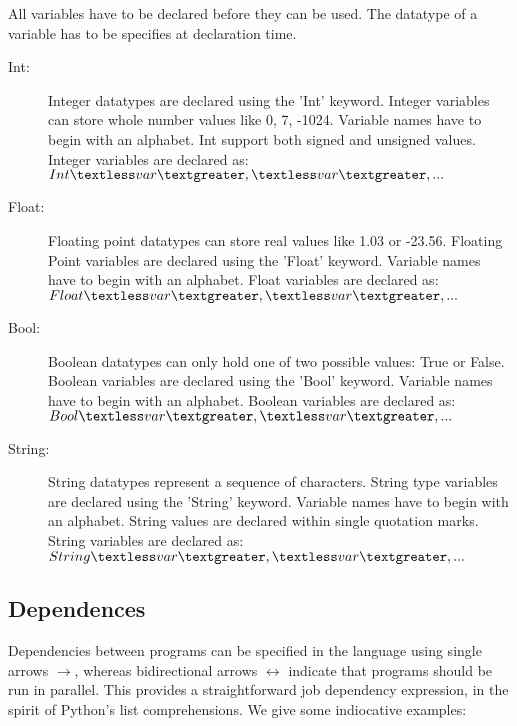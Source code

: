 All variables have to be declared before they can be used. The datatype of a 
variable has to be specifies at declaration time.
\begin{description}
\item [Int:] Integer datatypes are declared using the 'Int' keyword. Integer 
variables can store whole number values like 0, 7, -1024. Variable names have 
to begin with an alphabet. Int support both signed and unsigned values.
Integer variables are declared as:
$Int \textless var\textgreater, \textless var\textgreater, ...$ 



\item [Float:] Floating point datatypes can store real values like 1.03 or -23.56. 
Floating Point variables are declared using the 'Float' keyword. Variable names 
have to begin with an alphabet. Float variables are declared as:
$Float \textless  var\textgreater, \textless  var\textgreater, ...$



\item [Bool:] Boolean datatypes can only hold one of two possible values: 
True or False. Boolean variables are declared using the 'Bool' keyword. Variable 
names have to begin with an alphabet. Boolean variables are declared as:
$Bool \textless  var\textgreater, \textless  var\textgreater, ...$
%



\item [String:] String datatypes represent a sequence of characters. String type 
variables are declared using the 'String' keyword. Variable names have to begin
with an alphabet. String values are declared within single quotation marks.
String variables are declared as:
$String \textless var\textgreater, \textless  var\textgreater, ...$

\end{description}

\subsection{Dependences}
Dependencies between programs can be specified in the language using single arrows $\rightarrow$,
whereas bidirectional arrows $\leftrightarrow$ indicate that programs should be run in parallel. 
This provides a straightforward job dependency expression, in the spirit of Python's 
list comprehensions. We give some indiocative examples:


